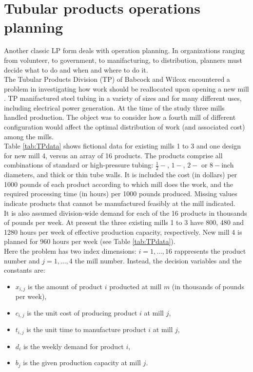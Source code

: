 \documentclass[a4paper,10 pt,titlepage,twoside]{book}
\theoremstyle{plain}
\theoremstyle{definition}
\theoremstyle{remark}
\begin{document}
\section{Tubular products operations planning}
Another classic LP form deals with operation planning. In organizations ranging from volunteer, to government, to manifacturing, to distribution, planners must decide what to do and when and where to do it.\\
The Tubular Products Division (TP) of Babcock and Wilcox encountered a problem in investigating how work should be reallocated upon opening a new mill \cite{FEM}. TP manifactured steel tubing in a variety of sizes and for many different uses, including electrical power generation. At the time of the study three mills handled production. The object was to consider how a fourth mill of different configuration would affect the optimal distribution of work (and associated cost) among the mills.\\Table \ref{tab:TPdata} shows fictional data for existing mills 1 to 3 and one design for new mill 4, versus an array of 16 products. The products comprise all combinations of standard or high-pressure tubing: $\frac{1}{2}-$, $1-$, $2-$ or $8-$inch diameters, and thick or thin tube walls. It is included the cost (in dollars) per 1000 pounds of each product according to which mill does the work, and the required processing time (in hours) per 1000 pounds produced. Missing values indicate products that cannot be manufactured feasibly at the mill indicated.\\
It is also assumed division-wide demand for each of the 16 products in thousands of pounds per week. At present the three existing mills 1 to 3 have 800, 480 and 1280 hours per week of effective production capacity, respectively. New mill 4 is planned for 960 hours per week (see Table \ref{tab:TPdata}).\\
Here the problem has two index dimensions: $i= 1, \dots, 16$ rappresents the product number and $j=1, \dots, 4$ the mill number. Instead, the decision variables and the constants are:
\begin{itemize}
	\item $x_{i,j}$ is the amount of product $i$ producted at mill $m$ (in thousands of pounds per week),
	\item $c_{i,j}$ is the unit cost of producing product $i$ at mill $j$,
	\item $t_{i,j}$ is the unit time to manufacture product $i$ at mill $j$,
	\item $d_{i}$ is the weekly demand for product $i$,
	\item $b_{j}$ is the given production capacity at mill $j$.
\end{itemize}
\end{document}

